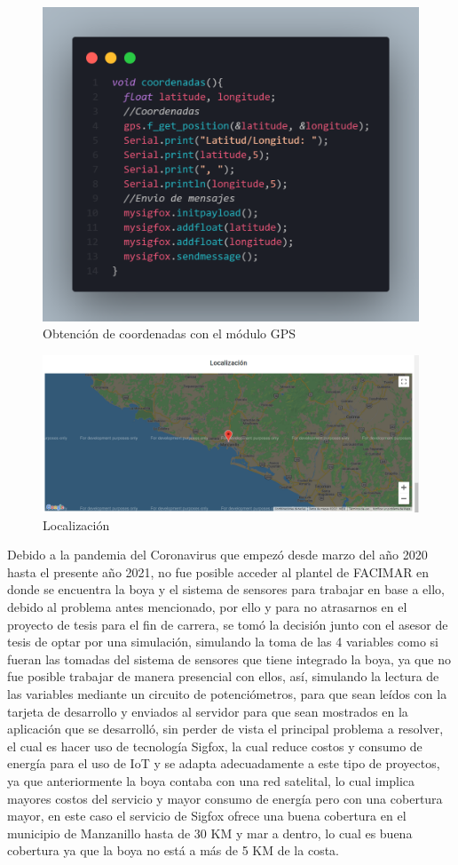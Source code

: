 \documentclass[12pt]{book}
\begin{document}
\begin{figure}[h!]
	\centering
	\includegraphics[width=0.7\linewidth]{imagenes/coordenadasArduino}
	\caption{Obtención de coordenadas con el módulo GPS}
	\label{fig:Obtención de coordenadas con el módulo GPS}
\end{figure}

\begin{figure}[h!]
	\centering
	\includegraphics[width=0.7\linewidth]{imagenes/localizacion}
	\caption{Localización}
	\label{fig:Localización}
\end{figure}


Debido a la pandemia del Coronavirus que empezó desde marzo del año 2020 hasta el presente año 2021, no fue posible acceder al plantel de FACIMAR en donde se encuentra la boya y el sistema de sensores para trabajar en base a ello, debido al problema antes mencionado, por ello y para no atrasarnos en el proyecto de tesis para el fin de carrera, se tomó la decisión junto con el asesor de tesis de optar por una simulación, simulando la toma de las 4 variables como si fueran las tomadas del sistema de sensores que tiene integrado la boya, ya que no fue posible trabajar de manera presencial con ellos, así, simulando la lectura de las variables mediante un circuito de potenciómetros, para que sean leídos con la tarjeta de desarrollo y enviados al servidor para que sean mostrados en la aplicación que se desarrolló, sin perder de vista el principal problema a resolver, el cual es hacer uso de tecnología Sigfox, la cual reduce costos y consumo de energía para el uso de IoT y se adapta adecuadamente a este tipo de proyectos, ya que anteriormente la boya contaba con una red satelital, lo cual implica mayores costos del servicio y mayor consumo de energía pero con una cobertura mayor, en este caso el servicio de Sigfox ofrece una buena cobertura en el municipio de Manzanillo hasta de 30 KM y mar a dentro, lo cual es buena cobertura ya que la boya no está a más de 5 KM de la costa. \\
\end{document}
